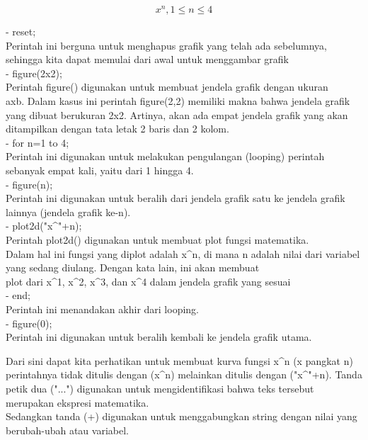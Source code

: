 \documentclass[a4paper,10pt]{article}
\begin{document}
\begin{eulernotebook}
\begin{eulercomment}
\begin{eulercomment}
\begin{eulercomment}
\end{eulercomment}
\begin{eulerformula}
\[
x^n,  1 \leq n \leq 4
\]
\end{eulerformula}
\begin{eulercomment}
- reset;\\
Perintah ini berguna untuk menghapus grafik yang telah ada sebelumnya,
sehingga kita dapat memulai dari awal untuk menggambar grafik\\
- figure(2x2);\\
Perintah figure() digunakan untuk membuat jendela grafik dengan ukuran\\
axb. Dalam kasus ini perintah figure(2,2) memiliki makna bahwa jendela
grafik yang dibuat berukuran 2x2. Artinya, akan ada empat jendela
grafik yang akan ditampilkan dengan tata letak 2 baris dan 2 kolom.\\
- for n=1 to 4;\\
Perintah ini digunakan untuk melakukan pengulangan (looping) perintah
sebanyak empat kali, yaitu dari 1 hingga 4.\\
- figure(n);\\
Perintah ini digunakan untuk beralih dari jendela grafik satu ke
jendela grafik lainnya (jendela grafik ke-n).\\
- plot2d("x\textasciicircum{}"+n);\\
Perintah plot2d() digunakan untuk membuat plot fungsi matematika.\\
Dalam hal ini fungsi yang diplot adalah x\textasciicircum{}n, di mana n adalah nilai
dari variabel yang sedang diulang. Dengan kata lain, ini akan membuat\\
plot dari x\textasciicircum{}1, x\textasciicircum{}2, x\textasciicircum{}3, dan x\textasciicircum{}4 dalam jendela grafik yang sesuai\\
- end;\\
Perintah ini menandakan akhir dari looping.\\
- figure(0);\\
Perintah ini digunakan untuk beralih kembali ke jendela grafik utama.
\end{eulercomment}
\begin{eulercomment}
Dari sini dapat kita perhatikan untuk membuat kurva fungsi x\textasciicircum{}n (x
pangkat n) perintahnya tidak ditulis dengan (x\textasciicircum{}n) melainkan ditulis
dengan ("x\textasciicircum{}"+n). Tanda petik dua ("...") digunakan untuk
mengidentifikasi bahwa teks tersebut merupakan ekspresi matematika.\\
Sedangkan tanda (+) digunakan untuk menggabungkan string dengan nilai
yang berubah-ubah atau variabel.


\end{eulercomment}
\end{eulercomment}
\end{eulercomment}
\end{eulernotebook}
\end{document}
